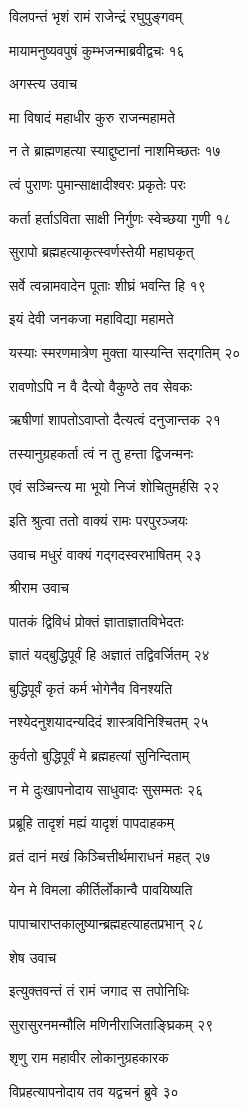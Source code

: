 विलपन्तं भृशं रामं राजेन्द्रं रघुपुङ्गवम्

मायामनुष्यवपुषं कुम्भजन्माब्रवीद्वचः १६

अगस्त्य उवाच

मा विषादं महाधीर कुरु राजन्महामते

न ते ब्राह्मणहत्या स्याद्दुष्टानां नाशमिच्छतः १७

त्वं पुराणः पुमान्साक्षादीश्वरः प्रकृतेः परः

कर्ता हर्ताऽविता साक्षी निर्गुणः स्वेच्छया गुणी १८

सुरापो ब्रह्महत्याकृत्स्वर्णस्तेयी महाघकृत्

सर्वे त्वन्नामवादेन पूताः शीघ्रं भवन्ति हि १९

इयं देवी जनकजा महाविद्या महामते

यस्याः स्मरणमात्रेण मुक्ता यास्यन्ति सद्गतिम् २०

रावणोऽपि न वै दैत्यो वैकुण्ठे तव सेवकः

ऋषीणां शापतोऽवाप्तो दैत्यत्वं दनुजान्तक २१

तस्यानुग्रहकर्ता त्वं न तु हन्ता द्विजन्मनः

एवं सञ्चिन्त्य मा भूयो निजं शोचितुमर्हसि २२

इति श्रुत्वा ततो वाक्यं रामः परपुरञ्जयः

उवाच मधुरं वाक्यं गद्गदस्वरभाषितम् २३

श्रीराम उवाच

पातकं द्विविधं प्रोक्तं ज्ञाताज्ञातविभेदतः

ज्ञातं यद्बुद्धिपूर्वं हि अज्ञातं तद्विवर्जितम् २४

बुद्धिपूर्वं कृतं कर्म भोगेनैव विनश्यति

नश्येदनुशयादन्यदिदं शास्त्रविनिश्चितम् २५

कुर्वतो बुद्धिपूर्वं मे ब्रह्महत्यां सुनिन्दिताम्

न मे दुःखापनोदाय साधुवादः सुसम्मतः २६

प्रब्रूहि तादृशं मह्यं यादृशं पापदाहकम्

व्रतं दानं मखं किञ्चित्तीर्थमाराधनं महत् २७

येन मे विमला कीर्तिर्लोकान्वै पावयिष्यति

पापाचाराप्तकालुष्यान्ब्रह्महत्याहतप्रभान् २८

शेष उवाच

इत्युक्तवन्तं तं रामं जगाद स तपोनिधिः

सुरासुरनमन्मौलि मणिनीराजिताङ्घ्रिकम् २९

शृणु राम महावीर लोकानुग्रहकारक

विप्रहत्यापनोदाय तव यद्वचनं ब्रुवे ३०

